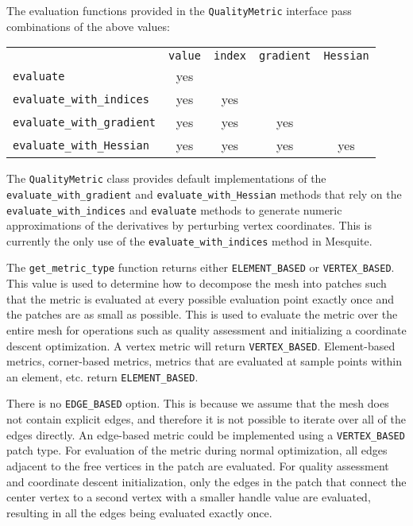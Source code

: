 \documentclass{article}
\begin{document}
The evaluation functions provided in the \texttt{QualityMetric} interface pass combinations of the above values:

\begin{center}
\begin{tabular}{lcccc}
&\texttt{value} & \texttt{index} & \texttt{gradient} & \texttt{Hessian} \\
\texttt{evaluate}                 & yes &     &     &     \\
\texttt{evaluate\_with\_indices}  & yes & yes &     &     \\
\texttt{evaluate\_with\_gradient} & yes & yes & yes &     \\
\texttt{evaluate\_with\_Hessian}  & yes & yes & yes & yes \\
\end{tabular}
\end{center}

The \texttt{QualityMetric} class provides default implementations of the \texttt{evaluate\_with\_gradient} and \texttt{evaluate\_with\_Hessian} methods that rely on the \texttt{evaluate\_with\_indices} and \texttt{evaluate} methods to generate numeric approximations of the derivatives by perturbing vertex coordinates.  This is currently the only use of the \texttt{evaluate\_with\_indices} method in Mesquite.

The \texttt{get\_metric\_type} function returns either \texttt{ELEMENT\_BASED} or \texttt{VERTEX\_BASED}.  This value is used to determine how to decompose the mesh into patches such that the metric is evaluated at every possible evaluation point exactly once and the patches are as small as possible.  This is used to evaluate the metric over the entire mesh for operations such as quality assessment and initializing a coordinate descent optimization.  A vertex metric will return \texttt{VERTEX\_BASED}.  Element-based metrics, corner-based metrics, metrics that are evaluated at sample points within an element, etc. return \texttt{ELEMENT\_BASED}.  

There is no \texttt{EDGE\_BASED} option.  This is because we assume that the mesh does not contain explicit edges, and therefore it is not possible to iterate over all of the edges directly.  An edge-based metric could be implemented using a \texttt{VERTEX\_BASED} patch type.  For evaluation of the metric during normal optimization, all edges adjacent to the free vertices in the patch are evaluated.  For quality assessment and coordinate descent initialization, only the edges in the patch that connect the center vertex to a second vertex with a smaller handle value are evaluated, resulting in all the edges being evaluated exactly once.
\end{document}
